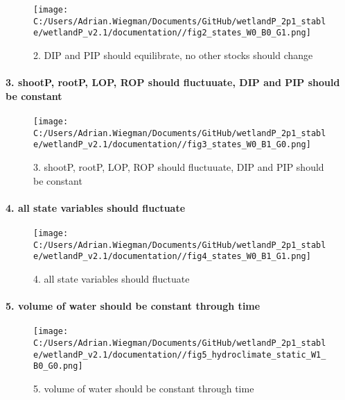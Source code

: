 \documentclass[
]{article}
\begin{document}
\begin{figure}
\centering
\texttt{[image: C:/Users/Adrian.Wiegman/Documents/GitHub/wetlandP\_2p1\_stable/wetlandP\_v2.1/documentation//fig2\_states\_W0\_B0\_G1.png]}
\caption{2. DIP and PIP should equilibrate, no other stocks should
change}
\end{figure}

\hypertarget{shootp-rootp-lop-rop-should-fluctuuate-dip-and-pip-should-be-constant}{%
\paragraph{3. shootP, rootP, LOP, ROP should fluctuuate, DIP and PIP
should be
constant}\label{shootp-rootp-lop-rop-should-fluctuuate-dip-and-pip-should-be-constant}}

\begin{figure}
\centering
\texttt{[image: C:/Users/Adrian.Wiegman/Documents/GitHub/wetlandP\_2p1\_stable/wetlandP\_v2.1/documentation//fig3\_states\_W0\_B1\_G0.png]}
\caption{3. shootP, rootP, LOP, ROP should fluctuuate, DIP and PIP
should be constant}
\end{figure}

\hypertarget{all-state-variables-should-fluctuate}{%
\paragraph{4. all state variables should
fluctuate}\label{all-state-variables-should-fluctuate}}

\begin{figure}
\centering
\texttt{[image: C:/Users/Adrian.Wiegman/Documents/GitHub/wetlandP\_2p1\_stable/wetlandP\_v2.1/documentation//fig4\_states\_W0\_B1\_G1.png]}
\caption{4. all state variables should fluctuate}
\end{figure}

\hypertarget{volume-of-water-should-be-constant-through-time}{%
\paragraph{5. volume of water should be constant through
time}\label{volume-of-water-should-be-constant-through-time}}

\begin{figure}
\centering
\texttt{[image: C:/Users/Adrian.Wiegman/Documents/GitHub/wetlandP\_2p1\_stable/wetlandP\_v2.1/documentation//fig5\_hydroclimate\_static\_W1\_B0\_G0.png]}
\caption{5. volume of water should be constant through time}
\end{figure}
\end{document}
